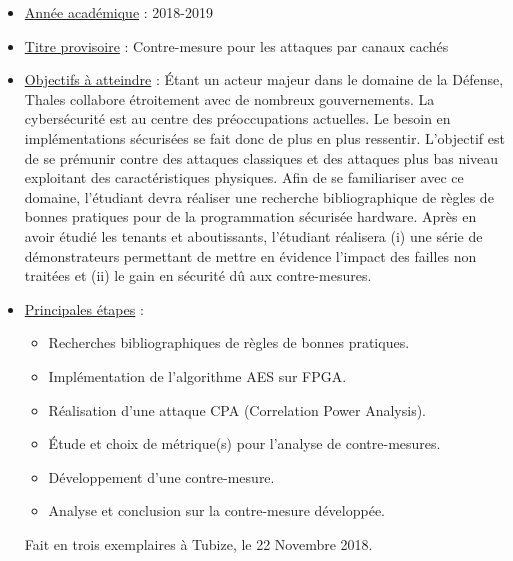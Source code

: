 \documentclass[oneside]{book}
\begin{document}
\vspace{1cm}
\begin{itemize}[label=$\bullet$]
\item \underline{Année académique} : 2018-2019 \\
\item \underline{Titre provisoire} : Contre-mesure pour les attaques par canaux cachés \\
\item \underline{Objectifs à atteindre} : Étant un acteur majeur dans le domaine de la Défense, Thales collabore étroitement avec de nombreux gouvernements. La cybersécurité est au centre des préoccupations actuelles. Le besoin en implémentations sécurisées se fait donc de plus en plus ressentir. L’objectif est de se prémunir contre des attaques classiques et des attaques plus bas niveau exploitant des caractéristiques physiques. Afin de se familiariser avec ce domaine, l’étudiant devra réaliser une recherche bibliographique de règles de bonnes pratiques pour de la programmation sécurisée hardware. Après en avoir étudié les tenants et aboutissants, l’étudiant réalisera (i) une série de démonstrateurs permettant de mettre en évidence l’impact des failles non traitées et (ii) le gain en sécurité dû aux contre-mesures. \\
\item \underline{Principales étapes} : \begin{itemize}
\item  Recherches bibliographiques de règles de bonnes pratiques.
\item Implémentation de l’algorithme AES sur FPGA.
\item Réalisation d’une attaque CPA (Correlation Power Analysis).
\item Étude et choix de métrique(s) pour l’analyse de contre-mesures.
\item Développement d’une contre-mesure.
\item Analyse et conclusion sur la contre-mesure développée. \\
\end{itemize}

Fait en trois exemplaires à Tubize, le 22 Novembre 2018.
\end{itemize}



\newpage

\end{document}
